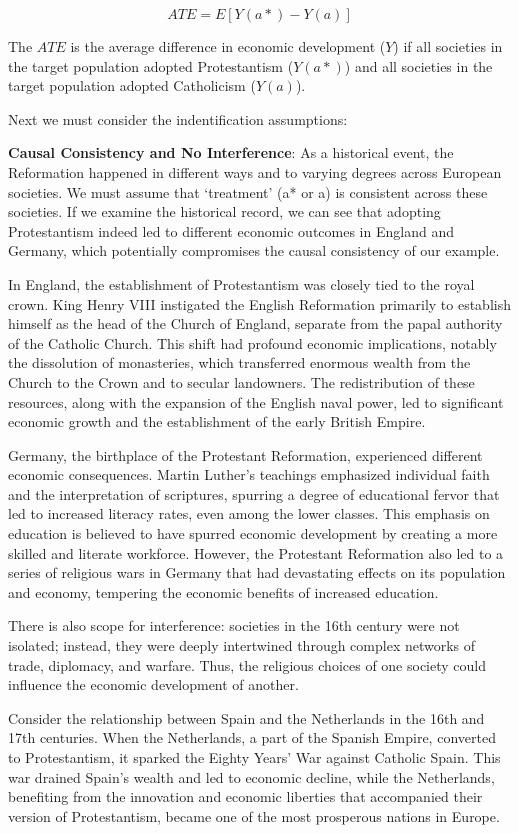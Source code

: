 \documentclass[
  singlecolumn]{report}
\begin{document}
\[ATE = E[Y(a*) - Y(a)]\]

The \(ATE\) is the average difference in economic development (\(Y\)) if
all societies in the target population adopted Protestantism (\(Y(a*)\))
and all societies in the target population adopted Catholicism
(\(Y(a)\)).

Next we must consider the indentification assumptions:

\textbf{Causal Consistency and No Interference}: As a historical event,
the Reformation happened in different ways and to varying degrees across
European societies. We must assume that `treatment' (a* or a) is
consistent across these societies. If we examine the historical record,
we can see that adopting Protestantism indeed led to different economic
outcomes in England and Germany, which potentially compromises the
causal consistency of our example.

In England, the establishment of Protestantism was closely tied to the
royal crown. King Henry VIII instigated the English Reformation
primarily to establish himself as the head of the Church of England,
separate from the papal authority of the Catholic Church. This shift had
profound economic implications, notably the dissolution of monasteries,
which transferred enormous wealth from the Church to the Crown and to
secular landowners. The redistribution of these resources, along with
the expansion of the English naval power, led to significant economic
growth and the establishment of the early British Empire.

Germany, the birthplace of the Protestant Reformation, experienced
different economic consequences. Martin Luther's teachings emphasized
individual faith and the interpretation of scriptures, spurring a degree
of educational fervor that led to increased literacy rates, even among
the lower classes. This emphasis on education is believed to have
spurred economic development by creating a more skilled and literate
workforce. However, the Protestant Reformation also led to a series of
religious wars in Germany that had devastating effects on its population
and economy, tempering the economic benefits of increased education.

There is also scope for interference: societies in the 16th century were
not isolated; instead, they were deeply intertwined through complex
networks of trade, diplomacy, and warfare. Thus, the religious choices
of one society could influence the economic development of another.

Consider the relationship between Spain and the Netherlands in the 16th
and 17th centuries. When the Netherlands, a part of the Spanish Empire,
converted to Protestantism, it sparked the Eighty Years' War against
Catholic Spain. This war drained Spain's wealth and led to economic
decline, while the Netherlands, benefiting from the innovation and
economic liberties that accompanied their version of Protestantism,
became one of the most prosperous nations in Europe.
\end{document}
